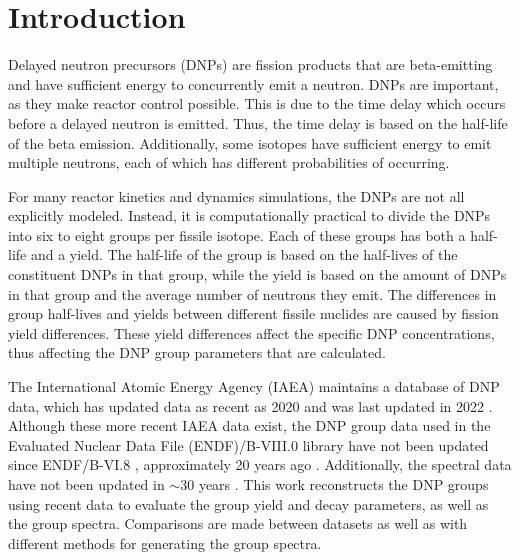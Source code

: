\documentclass{style/nseJournal}
\begin{document}
\section{Introduction}

Delayed neutron precursors (DNPs) are fission products that are beta-emitting and have sufficient energy to concurrently emit a neutron.
DNPs are important, as they make reactor control possible.
This is due to the time delay which occurs before a delayed neutron is emitted.
Thus, the time delay is based on the half-life of the beta emission.
Additionally, some isotopes have sufficient energy to emit multiple neutrons, each of which has different probabilities of occurring.

For many reactor kinetics and dynamics simulations, the DNPs are not all explicitly modeled.
Instead, it is computationally practical to divide the DNPs into six to eight groups per fissile isotope. 
Each of these groups has both a half-life and a yield.
The half-life of the group is based on the half-lives of the constituent DNPs in that group, while the yield is based on the amount of DNPs in that group and the average number of neutrons they emit.
The differences in group half-lives and yields between different fissile nuclides are caused by fission yield differences.
These yield differences affect the specific DNP concentrations, thus affecting the DNP group parameters that are calculated.

The International Atomic Energy Agency (IAEA) maintains a database of DNP data, which has updated data as recent as 2020 and was last updated in 2022 \cite{DIMITRIOU2021144}.
Although these more recent IAEA data exist, the DNP group data used in the Evaluated Nuclear Data File (ENDF)/B-VIII.0 library have not been updated since ENDF/B-VI.8 \cite{BROWN20181}, approximately 20 years ago \cite{parish1999status}. Additionally, the spectral data have not been updated in $\sim$30 years \cite{CHADWICK20062931, dnpthesis}. This work reconstructs the DNP groups using recent data to evaluate the group yield and decay parameters, as well as the group spectra.
Comparisons are made between datasets as well as with different methods for generating the group spectra.
\end{document}
